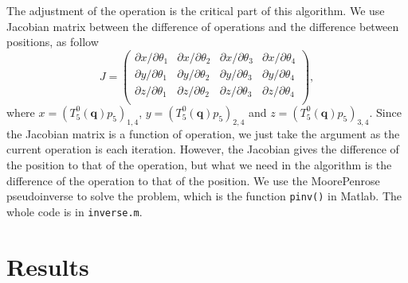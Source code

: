 \documentclass[xcolor=x11names]{article}
\begin{document}
   The adjustment of the operation is the critical part of this algorithm. We use Jacobian matrix between the difference of operations and the difference between positions, as follow
   \begin{equation}
      J = \begin{pmatrix}
         \partial x / \partial \theta_1 & \partial x /\partial \theta_2 & \partial x /\partial \theta_3 & \partial x /\partial \theta_4 \\
         \partial y / \partial \theta_1 & \partial y /\partial \theta_2 & \partial y /\partial \theta_3 & \partial y /\partial \theta_4 \\
         \partial z / \partial \theta_1 & \partial z /\partial \theta_2 & \partial z /\partial \theta_3 & \partial z /\partial \theta_4 \\
   \end{pmatrix},
   \end{equation}
where $x = (T_5^0(\mathbf{q})  p_5)_{1,4}$, $y = (T_5^0(\mathbf{q})  p_5)_{2,4}$ and $z = (T_5^0(\mathbf{q})  p_5)_{3,4}$. Since the Jacobian matrix is a function of operation, we just take the argument as the current operation is each iteration. However, the Jacobian gives the difference of the position to that of the operation, but what we need in the algorithm is the difference of the operation to that of the position. We use the Moore\textendash Penrose pseudoinverse to solve the problem, which is the function \texttt{pinv()} in Matlab. The whole code is in \texttt{inverse.m}.


\section{Results}






%
\end{document}
